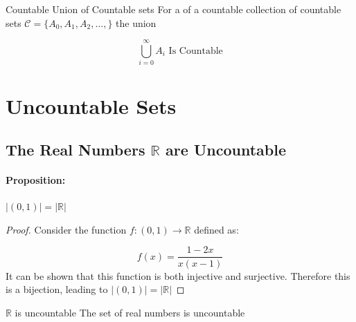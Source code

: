 \documentclass[16pt,a4paper]{article}
\theoremstyle{definition}
\begin{document}
\begin{thm}{Countable Union of Countable sets}{}
For a of a countable collection of countable sets $\mathcal{C} = \{A_0, A_1, A_2, \ldots,\}$ the union

\[
\bigcup_{i=0}^\infty A_i \text{ Is Countable}
\]

\end{thm} 



\newpage

\section{Uncountable Sets}

\subsection{The Real Numbers $\mathbb{R}$ are Uncountable}


\paragraph{Proposition:} $|(0,1)| = |\mathbb{R}|$
\begin{proof}
Consider the function  $f:(0,1) \rightarrow \mathbb{R}$ defined as:

\[f(x) = \frac{1-2x}{x(x-1)}\]
It can be shown that this function is both injective and surjective. Therefore this is a bijection, leading to $|(0,1)| = |\mathbb{R}|$
\end{proof}


\begin{thm}{$\mathbb{R}$ is uncountable}{}
The set of real numbers is uncountable
\end{thm}
\end{document}
